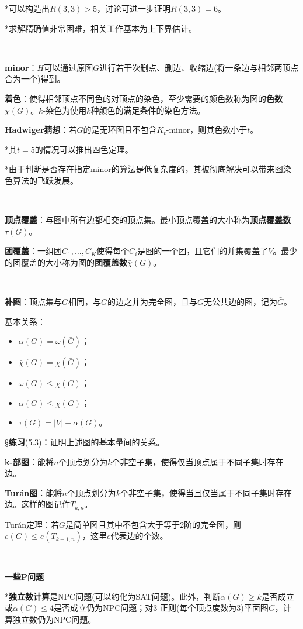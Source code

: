 \documentclass[a4paper,UTF8,fontset=windows]{ctexart}
\newcommand{\exce}[2]{\S\textbf{练习}(#1)：{\kaishu #2}}
\begin{document}
*可以构造出$R(3,3)>5$，讨论可进一步证明$R(3,3)=6$。

*求解精确值非常困难，相关工作基本为上下界估计。

\

\textbf{minor}：$H$可以通过原图$G$进行若干次删点、删边、收缩边(将一条边与相邻两顶点合为一个)得到。

\textbf{着色}：使得相邻顶点不同色的对顶点的染色，至少需要的颜色数称为图的\textbf{色数}$\chi(G)$。$k$-染色为使用$k$种颜色的满足条件的染色方法。

\textbf{Hadwiger猜想}：若$G$的是无环图且不包含$K_t$-minor，则其色数小于$t$。

*其$t=5$的情况可以推出四色定理。

*由于判断是否存在指定minor的算法是低复杂度的，其被彻底解决可以带来图染色算法的飞跃发展。

\

\textbf{顶点覆盖}：与图中所有边都相交的顶点集。最小顶点覆盖的大小称为\textbf{顶点覆盖数}$\tau(G)$。

\textbf{团覆盖}：一组团$C_1,\dots,C_K$使得每个$C_i$是图的一个团，且它们的并集覆盖了$V$。最少的团覆盖的大小称为图的\textbf{团覆盖数}$\bar{\chi}(G)$。

\

\textbf{补图}：顶点集与$G$相同，与$G$的边之并为完全图，且与$G$无公共边的图，记为$\bar{G}$。

基本关系：
\begin{itemize}
    \item $\alpha(G)=\omega(\bar{G})$；
    \item $\bar{\chi}(G)=\chi(\bar{G})$；
    \item $\omega(G)\le\chi(G)$；
    \item $\alpha(G)\le\bar{\chi}(G)$；
    \item $\tau(G)=|V|-\alpha(G)$。
\end{itemize}

\exce{5.3}{证明上述图的基本量间的关系。}

\textbf{k-部图}：能将$n$个顶点划分为$k$个非空子集，使得仅当顶点属于不同子集时存在边。

\textbf{Tur\'an图}：能将$n$个顶点划分为$k$个非空子集，使得当且仅当属于不同子集时存在边。这样的图记作$T_{k,n}$。

Tur\'an定理：若$G$是简单图且其中不包含大于等于2阶的完全图，则$e(G)\le e(T_{k-1,n})$，这里$e$代表边的个数。

\

\textbf{一些P问题}

*\textbf{独立数计算}是NPC问题(可以约化为SAT问题)。此外，判断$\alpha(G)\ge k$是否成立或$\alpha(G)\le4$是否成立仍为NPC问题；对3-正则(每个顶点度数为3)平面图$G$，计算独立数仍为NPC问题。
\end{document}
